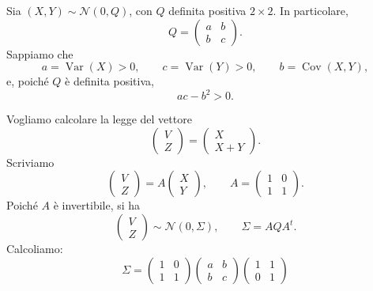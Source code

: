 \documentclass[a4paper]{article}
\begin{document}
\begin{snippetexercise}{}
    Sia \((X,Y) \sim \mathcal N(0, Q)\), con \(Q\) definita positiva
    \(2 \times 2\). In particolare,
    \[
        Q=
        \begin{pmatrix}
            a & b \\ b & c
        \end{pmatrix}.
    \]
    Sappiamo che
    \[
        a = \operatorname{Var}(X) > 0, \qquad
        c = \operatorname{Var}(Y) > 0, \qquad
        b = \operatorname{Cov}(X,Y),
    \]
    e, poiché \(Q\) è definita positiva,
    \[
        ac-b^2 > 0.
    \]

    Vogliamo calcolare la legge del vettore
    \[
        \begin{pmatrix}
            V \\ Z
        \end{pmatrix}
        =
        \begin{pmatrix}
            X \\ X+Y
        \end{pmatrix}.
    \]
    Scriviamo
    \[
        \begin{pmatrix}
            V \\ Z
        \end{pmatrix}
        =
        A
        \begin{pmatrix}
            X \\ Y
        \end{pmatrix},
        \qquad
        A =
        \begin{pmatrix}
            1 & 0 \\ 1 & 1
        \end{pmatrix}.
    \]
    Poiché \(A\) è invertibile, si ha
    \[
        \begin{pmatrix}
            V \\ Z
        \end{pmatrix}
        \sim
        \mathcal N(0, \Sigma),
        \qquad
        \Sigma = AQA^t.
    \]
    Calcoliamo:
    \[
        \Sigma
        =
        \begin{pmatrix}
            1 & 0 \\ 1 & 1
        \end{pmatrix}
        \begin{pmatrix}
            a & b \\ b & c
        \end{pmatrix}
        \begin{pmatrix}
            1 & 1 \\ 0 & 1

\end{pmatrix}\]
\end{snippetexercise}
\end{document}
